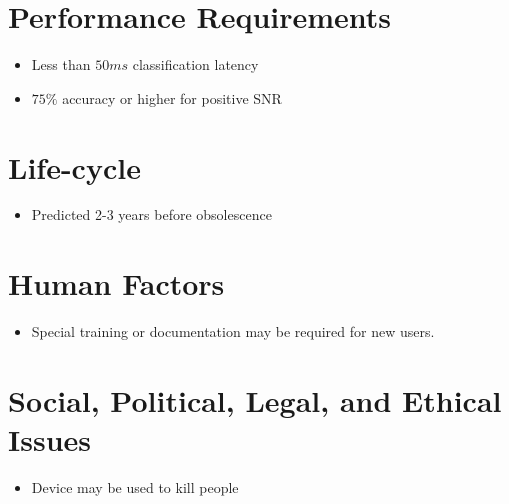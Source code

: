 \documentclass[12pt]{article}
\begin{document}
\section{Performance Requirements}
\begin{itemize}
\item Less than $50ms$ classification latency
\item $75\%$ accuracy or higher for positive SNR
\end{itemize}
\section{Life-cycle}
\begin{itemize}
\item Predicted 2-3 years before obsolescence
\end{itemize}
\section{Human Factors}
\begin{itemize}
\item Special training or documentation may be required for new users.
\end{itemize}
\section{Social, Political, Legal, and Ethical Issues}
\begin{itemize}
\item Device may be used to kill people
\end{itemize}
\end{document}
